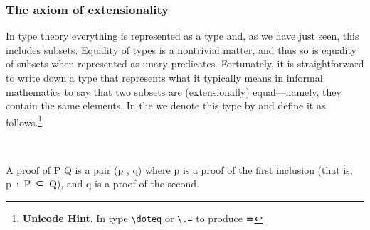 \subsubsection{The axiom of extensionality}\label{sec:axiom-ext}
In type theory everything is represented as a type and, as we have just seen, this includes subsets.  Equality of types is a nontrivial matter, and thus so is equality of subsets when represented as unary predicates.  Fortunately, it is straightforward to write down a type that represents what it typically means in informal mathematics to say that two subsets are (extensionally) equal---namely, they contain the same elements. In the \ualib we denote this type by  and define it as follows.\footnote{%
\textbf{Unicode Hint}. In \agdamode type \texttt{\textbackslash{}doteq} or \texttt{\textbackslash{}.=} to produce ≐}
\ccpad
\begin{code}
\>[0]\AgdaSpace{}%
\AgdaSymbol{:}\AgdaSpace{}%
\AgdaSpace{}%
\AgdaSpace{}%
\AgdaSpace{}%
\AgdaSpace{}%
\AgdaSpace{}%
\AgdaSpace{}%
\AgdaSpace{}%
\AgdaSpace{}%
\AgdaSpace{}%
\AgdaSpace{}%
\AgdaSpace{}%
\AgdaSpace{}%
\AgdaSpace{}%
\<%
\\
\>[0]\AgdaSpace{}%
\AgdaSpace{}%
\AgdaSpace{}%
\AgdaSymbol{=}\AgdaSpace{}%
\AgdaSymbol{(}\AgdaSpace{}%
\AgdaSpace{}%
\AgdaSymbol{)}\AgdaSpace{}%
\AgdaSpace{}%
\AgdaSymbol{(}\AgdaSpace{}%
\AgdaSpace{}%
\AgdaSymbol{)}\<%
\end{code}
\ccpad
A proof of \ab P  Q is a pair (\ab p , \ab q) where \ab p is a proof of the first inclusion (that is, \ab p~\as :~\ab P~\aof ⊆~\ab Q), and \ab q is a proof of the second.

